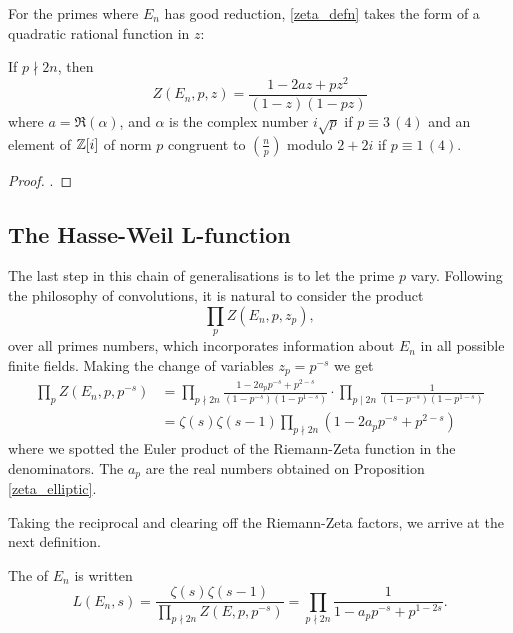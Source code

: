 \documentclass[12pt, a4paper]{amsart}
\begin{document}
For the primes where $E_n$ has good reduction, \autoref{zeta_defn} takes
the form of a quadratic rational function in $z$:

\begin{prop} \label{zeta_elliptic}
  If $p \nmid 2n$, then
  \[Z(E_n, p, z) = \frac{1 - 2az + pz^2}{(1-z)(1-pz)} \]
  where $a = \Re(\alpha)$, and $\alpha$ is the complex number
  $i\sqrt{p}$ if $p \equiv 3 \, (4)$ and an element of ${\mathbb Z}[i]$ of
  norm $p$ congruent to $(\frac{n}{p})$ modulo $2+2i$ if $p \equiv 1 \, (4)$. 
\end{prop}

\begin{proof}
  \cite[See][Chater II-2, pages 59-61]{modular}.
\end{proof}



\subsection{The Hasse-Weil L-function}

The last step in this chain of generalisations is to let the prime $p$ vary.
Following the
philosophy of convolutions, it is natural to consider the product
\[\prod\limits_{p} Z(E_n, p, z_p),\]
over all primes numbers,
which incorporates information about $E_n$ in all possible finite fields.
 Making
the change of variables $z_p = p^{-s}$ we get
\[
  \begin{split}
    \prod\limits_{p} Z(E_n, p, p^{-s}) &= \prod\limits_{p \nmid 2n}
    \frac{1-2a_pp^{-s} + p^{2-s}}{(1-p^{-s})(1-p^{1-s})} \cdot \prod\limits_{p \mid
      2n} \frac{1}{(1-p^{-s})(1-p^{1-s})} \\  &=\zeta(s) \zeta(s-1) \prod\limits_{p
      \nmid 2n} (1 - 2a_pp^{-s} + p^{2-s})
  \end{split}
\]
where we spotted the Euler product of the Riemann-Zeta function in the
denominators. The $a_p$ are the real numbers obtained on
Proposition \autoref{zeta_elliptic}.

Taking the reciprocal and clearing off the Riemann-Zeta factors, we arrive at
the next definition.

\begin{defn}
  The  of $E_n$ is written
  \begin{equation} \label{eq:lfunction}
    L(E_n, s) = \frac{\zeta(s) \zeta(s-1)}{\prod_{p \nmid 2n} Z(E, p, p^{-s})}
    = \prod\limits_{p \nmid 2n} \frac{1}{1-a_pp^{-s} + p^{1-2s}}.
  \end{equation}
\end{defn}
\end{document}
